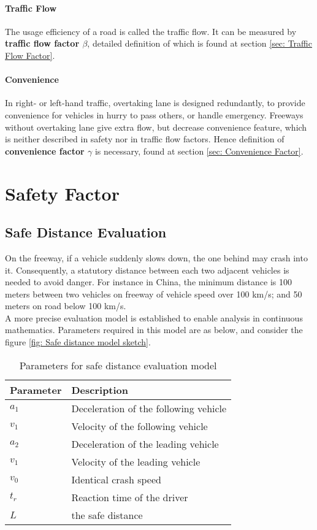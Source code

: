 \paragraph{Traffic Flow} The usage efficiency of a road is 
called the traffic flow. It can be measured by \textbf{traffic 
flow factor $\beta$}, detailed definition of which is found at 
section \ref{sec: Traffic Flow Factor}.

\paragraph{Convenience} In right- or left-hand traffic, 
overtaking lane is designed redundantly, to provide 
convenience for vehicles in hurry to pass others, or handle 
emergency. Freeways without overtaking lane give extra flow, 
but decrease convenience feature, which is neither described 
in safety nor in traffic flow factors. Hence definition of 
\textbf{convenience factor $\gamma$} is necessary, found at  
section \ref{sec: Convenience Factor}.


\section{Safety Factor}
\label{sec: Safety Factor}

\subsection{Safe Distance Evaluation}
\label{sec: Safe Distance Evaluation}

On the freeway, if a vehicle suddenly slows down, the one 
behind may crash into it. Consequently, a statutory 
distance between each two adjacent vehicles is needed to 
avoid danger. For instance in China, the minimum distance 
is 100 meters between two vehicles on freeway of vehicle 
speed over 100 km/s; and 50 meters on road below 100 km/s.
\cite{PRC_State_Council_Decree_405}\\

A more precise evaluation model is established to enable 
analysis in continuous mathematics. Parameters required 
in this model are as below, and consider the figure 
\ref{fig: Safe distance model sketch}.

\begin{table}
\centering
\begin{tabular}{ll}
\hline
Parameter & Description\\
\hline
$a_1$ & Deceleration of the following vehicle \\
$v_1$ & Velocity of the following vehicle \\
$a_2$ & Deceleration of the leading vehicle \\
$v_1$ & Velocity of the leading vehicle \\
$v_0$ & Identical crash speed \\
$t_r$ & Reaction time of the driver \\
$L$   & the safe distance \\
\hline
\end{tabular}
\caption{Parameters for safe distance evaluation model}
\end{table}

